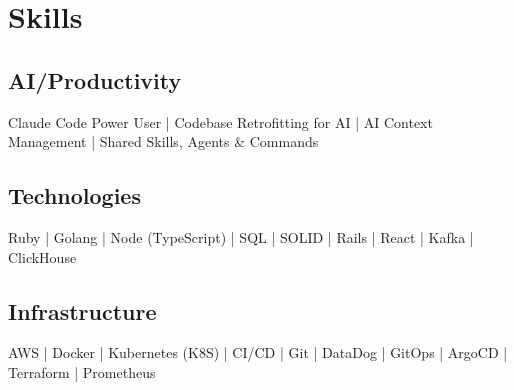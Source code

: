 
\section{Skills}
  \subsection{AI/Productivity}
  Claude Code Power User | Codebase Retrofitting for AI | AI Context Management | Shared Skills, Agents \& Commands \\
  \subsection{Technologies}
  Ruby | Golang | Node (TypeScript) | SQL | SOLID | Rails | React | Kafka | ClickHouse \\
  \subsection{Infrastructure}
  AWS | Docker | Kubernetes (K8S) | CI/CD | Git | DataDog | GitOps | ArgoCD | Terraform | Prometheus \\
